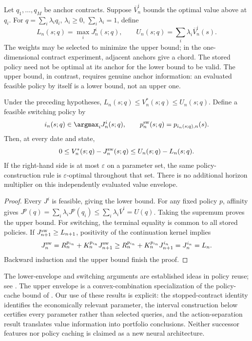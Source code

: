 Let $q_1,\ldots,q_M$ be anchor contracts. Suppose $\overline V^i_n$ bounds the optimal value above at $q_i$. For $q=\sum_i\lambda_iq_i$, $\lambda_i\geq0$, $\sum_i\lambda_i=1$, define
\begin{equation}
 L_n(s;q)=\max_i J^i_n(s;q),\qquad
 U_n(s;q)=\sum_i\lambda_i\overline V^i_n(s).
 \label{eq:envelopes}
\end{equation}
The weights may be selected to minimize the upper bound; in the one-dimensional contract experiment, adjacent anchors give a chord. The stored policy need not be optimal at its anchor for the lower bound to be valid. The upper bound, in contrast, requires genuine anchor information: an evaluated feasible policy by itself is a lower bound, not an upper one.

\begin{theorem}
\label{thm:reuse}
Under the preceding hypotheses, $L_n(s;q)\leq V_n^*(s;q)\leq U_n(s;q)$. Define a feasible switching policy by
\begin{equation}
 i_n(s;q)\in\argmax_iJ^i_n(s;q),\qquad
 p_n^{\rm sw}(s;q)=p_{i_n(s;q),n}(s).
 \label{eq:switch}
\end{equation}
Then, at every date and state,
\begin{equation}
 0\leq V_n^*(s;q)-J_n^{\rm sw}(s;q)
 \leq U_n(s;q)-L_n(s;q).
 \label{eq:reuse_bound}
\end{equation}
If the right-hand side is at most $\varepsilon$ on a parameter set, the same policy-construction rule is $\varepsilon$-optimal throughout that set. There is no additional horizon multiplier on this independently evaluated value envelope.
\end{theorem}

\begin{proof}
Every $J^i$ is feasible, giving the lower bound. For any fixed policy $p$, affinity gives $J^p(q)=\sum_i\lambda_iJ^p(q_i)\leq\sum_i\lambda_i\overline V^i=U(q)$. Taking the supremum proves the upper bound. For switching, the terminal equality is common to all stored policies. If $J_{n+1}^{\rm sw}\geq L_{n+1}$, positivity of the continuation kernel implies
\[
 J_n^{\rm sw}=R_n^{p_{i_n}}+K_n^{p_{i_n}}J_{n+1}^{\rm sw}
 \geq R_n^{p_{i_n}}+K_n^{p_{i_n}}J^{i_n}_{n+1}
 =J^{i_n}_n=L_n.
\]
Backward induction and the upper bound finish the proof.
\end{proof}

The lower-envelope and switching arguments are established ideas in policy reuse; see \citet{barreto2017,chang2021}. The upper envelope is a convex-combination specialization of the policy-cache bound of \citet{nemecek2021}. Our use of these results is explicit: the stopped-contract identity identifies the economically relevant parameter, the interval construction below certifies every parameter rather than selected queries, and the action-separation result translates value information into portfolio conclusions. Neither successor features nor policy caching is claimed as a new neural architecture.

